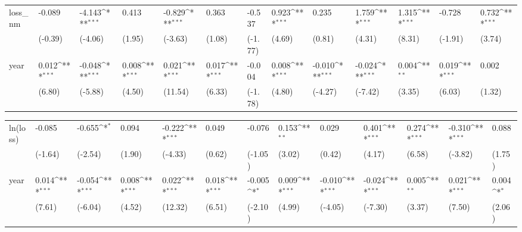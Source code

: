 \def\sym#1{\ifmmode^{#1}\else\(^{#1}\)\fi}
\begin{tabular}{p{1.5cm} p{1.7cm} p{1.7cm} p{1.7cm} p{1.7cm} p{1.7cm} p{1.7cm} p{1.7cm} p{1.7cm} p{1.7cm} p{1.7cm} p{1.7cm} p{1.7cm}}
\hline
loss\_nm         &   -0.089         &   -4.143\sym{***}&    0.413         &   -0.829\sym{***}&    0.363         &   -0.537         &    0.923\sym{***}&    0.235         &    1.759\sym{***}&    1.315\sym{***}&   -0.728         &    0.732\sym{***}\\
                &  (-0.39)         &  (-4.06)         &   (1.95)         &  (-3.63)         &   (1.08)         &  (-1.77)         &   (4.69)         &   (0.81)         &   (4.31)         &   (8.31)         &  (-1.91)         &   (3.74)         \\
year            &    0.012\sym{***}&   -0.048\sym{***}&    0.008\sym{***}&    0.021\sym{***}&    0.017\sym{***}&   -0.004         &    0.008\sym{***}&   -0.010\sym{***}&   -0.024\sym{***}&    0.004\sym{**} &    0.019\sym{***}&    0.002         \\
                &   (6.80)         &  (-5.88)         &   (4.50)         &  (11.54)         &   (6.33)         &  (-1.78)         &   (4.80)         &  (-4.27)         &  (-7.42)         &   (3.35)         &   (6.03)         &   (1.32)         \\
\end{tabular}
\def\sym#1{\ifmmode^{#1}\else\(^{#1}\)\fi}
\begin{tabular}{p{1.5cm} p{1.7cm} p{1.7cm} p{1.7cm} p{1.7cm} p{1.7cm} p{1.7cm} p{1.7cm} p{1.7cm} p{1.7cm} p{1.7cm} p{1.7cm} p{1.7cm}}
\hline
ln(loss)        &   -0.085         &   -0.655\sym{*}  &    0.094         &   -0.222\sym{***}&    0.049         &   -0.076         &    0.153\sym{**} &    0.029         &    0.401\sym{***}&    0.274\sym{***}&   -0.310\sym{***}&    0.088         \\
                &  (-1.64)         &  (-2.54)         &   (1.90)         &  (-4.33)         &   (0.62)         &  (-1.05)         &   (3.02)         &   (0.42)         &   (4.17)         &   (6.58)         &  (-3.82)         &   (1.75)         \\
year            &    0.014\sym{***}&   -0.054\sym{***}&    0.008\sym{***}&    0.022\sym{***}&    0.018\sym{***}&   -0.005\sym{*}  &    0.009\sym{***}&   -0.010\sym{***}&   -0.024\sym{***}&    0.005\sym{**} &    0.021\sym{***}&    0.004\sym{*}  \\
                &   (7.61)         &  (-6.04)         &   (4.52)         &  (12.32)         &   (6.51)         &  (-2.10)         &   (4.99)         &  (-4.05)         &  (-7.30)         &   (3.37)         &   (7.50)         &   (2.06)         \\
\end{tabular}
